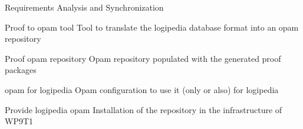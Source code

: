 \begin{workpackage}[id=access,wphases=0-48,type=MGT,
  short=Access,%
  title={Access to the infrastructure},
  lead=Inr,
  InrRM=28,
  OcaRM=6]
\begin{tasklist}
\begin{task}[id=transfer,title=Transfer for the sustainability of the system,lead=Irt]
\end{task}



\end{tasklist}

\begin{wpdelivs}
  \begin{wpdeliv}[due=3,miles=startup,id=requirements,dissem=PU,nature=DEM,lead=Inr]
      {Requirements Analysis and Synchronization}
  \end{wpdeliv}
  \begin{wpdeliv}[due=2,miles=???,id=acessopamtool,dissem=PU,nature=DEM,lead=Oca]
    {Proof to opam tool}
    Tool to translate the logipedia database format into an opam repository
  \end{wpdeliv}
  \begin{wpdeliv}[due=2,miles=???,id=acessopamrepo,dissem=PU,nature=DEM,lead=Oca]
    {Proof opam repository}
    Opam repository populated with the generated proof packages
  \end{wpdeliv}
  \begin{wpdeliv}[due=1,miles=???,id=accessopamconfig,dissem=PU,nature=DEM,lead=Oca]
    {opam for logipedia}
    Opam configuration to use it (only or also) for logipedia
  \end{wpdeliv}
  \begin{wpdeliv}[due=1,miles=???,id=accessopam,dissem=PU,nature=DEM,lead=Oca]
    {Provide logipedia opam}
    Installation of the repository in the infrastructure of WP9T1
  \end{wpdeliv}
\end{wpdelivs}
\end{workpackage}


